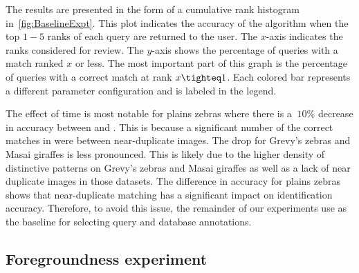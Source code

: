         The results are presented in the form of a cumulative rank
          histogram in~\cref{fig:BaselineExpt}.
        This plot indicates the accuracy of the algorithm when the top
          $1-5$ ranks of each query are returned to the user.
        The $x$-axis indicates the ranks considered for review.
        The $y$-axis shows the percentage of queries with a
          \groundtrue{} match ranked $x$ or less.
        The most important part of this graph is the percentage of
          queries with a correct match at rank $x\tighteq1$.
        Each colored bar represents a different parameter configuration
          and is labeled in the legend.

        \BaselineExpt{}

        \begin{comment}
        python -m ibeis -e print --db PZ_Master1 -a ctrl timectrl -t baseline  
        python -m ibeis -e print --db GZ_Master1 -a ctrl timectrl -t baseline  
        python -m ibeis -e print --db GIRM_Master1 -a ctrl timectrl1h -t baseline  
        \end{comment}
        The effect of time is most notable for plains zebras where
          there is a $~10\percent$ decrease in accuracy between \ctrl{}
          and \timectrl{}.
        This is because a significant number of the correct matches in
          \ctrl{} were between near-duplicate images.
        The drop for Grevy's zebras and Masai giraffes is less
          pronounced.
        This is likely due to the higher density of distinctive
          patterns on Grevy's zebras and Masai giraffes as well as a lack
          of near duplicate images in those datasets.
        The difference in accuracy for plains zebras shows that
          near-duplicate matching has a significant impact on
          identification accuracy.
        Therefore, to avoid this issue, the remainder of our
          experiments use \timectrl{} as the baseline for selecting query
          and database annotations.

    \subsection{Foregroundness experiment}\label{sub:exptfeatmatchscore}

    \ForegroundExpt{}

